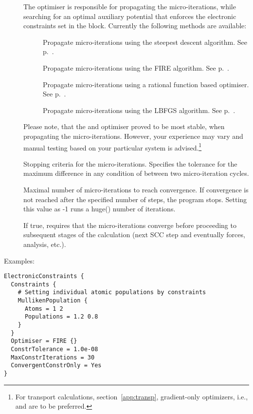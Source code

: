 \begin{description}
\item[]
  The optimiser is responsible for propagating the micro-iterations, while searching
  for an optimal auxiliary potential that enforces the electronic constraints set
  in the  block.
  Currently the following methods are available:
  \begin{description}
    \item[] Propagate micro-iterations using the
      steepest descent algorithm. See p.~.
    \item[] Propagate micro-iterations using the FIRE
      algorithm. See p.~.
    \item[] Propagate micro-iterations using a
      rational function based optimiser. See p.~.
    \item[] Propagate micro-iterations using the LBFGS
      algorithm. See p.~.
  \end{description}
  Please note, that the  and 
  optimiser proved to be most stable, when propagating the
  micro-iterations. However, your experience may vary and manual
  testing based on your particular system is advised.\footnote{For
  transport calculations, section~\ref{app:transp}, gradient-only
  optimizers, i.e.,  and  are to be
  preferred.}

\item[] Stopping criteria for the micro-iterations.
  Specifies the tolerance for the maximum difference in any condition of
   between two micro-iteration cycles.

\item[] Maximal number of micro-iterations to reach
  convergence. If convergence is not reached after the specified
  number of steps, the program stops. Setting this value as -1 runs a
  huge() number of iterations.

\item[] If true, requires that the micro-iterations
  converge before proceeding to subsequent stages of the calculation (next SCC
  step and eventually forces, analysis, etc.).
\end{description}

Examples:
\begin{verbatim}
ElectronicConstraints {
  Constraints {
    # Setting individual atomic populations by constraints
    MullikenPopulation {
      Atoms = 1 2
      Populations = 1.2 0.8
    }
  }
  Optimiser = FIRE {}
  ConstrTolerance = 1.0e-08
  MaxConstrIterations = 30
  ConvergentConstrOnly = Yes
}
\end{verbatim}

